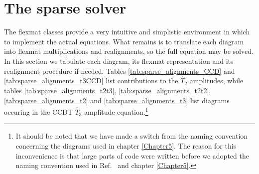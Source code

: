 \FloatBarrier

\section{The sparse solver}

The flexmat classes provide a very intuitive and simplistic
environment in which to implement the actual equations. What remains
is to translate each diagram into flexmat multiplications and
realignments, so the full equation may be solved. In this section we
tabulate each diagram, its flexmat representation and its realignment
procedure if needed. Tables \ref{tab:sparse_alignments_CCD} and
\ref{tab:sparse_alignments_t3CCD} list contributions to the $\hat{T}_2$
amplitudes, while tables \ref{tab:sparse_alignments_t2t3},
\ref{tab:sparse_alignments_t2t2}, \ref{tab:sparse_alignments_t2} and
\ref{tab:sparse_alignments_t3} list diagrams occuring in the CCDT $\hat{T}_3$
amplitude equation.\footnote{It should be noted that we have made a
  switch from the naming convention concerning the diagrams used in
  chapter \ref{Chapter5}. The reason for this inconvenience is that
  large parts of code were written before we adopted the naming
  convention used in Ref.~\cite{ShavittBartlett2009} and chapter
  \ref{Chapter5}.}


